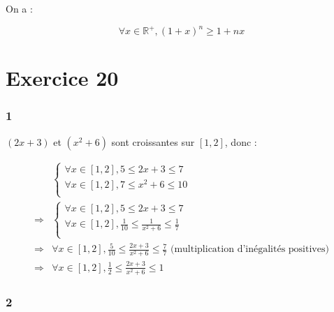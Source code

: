 \documentclass{report}
\begin{document}
On a :

\begin{displaymath}
	\forall x \in \mathbb{R}^{+}, (1+x)^n  \geq 1 + nx
\end{displaymath}

\section*{Exercice 20}

\subsubsection*{1}

$(2x+3)$ et $(x^2+6)$ sont croissantes sur $[1, 2]$, donc :

\begin{equation*}
	\begin{split}
	&\begin{cases}
		\forall x \in [1, 2], 5 \le 2x+3 \le 7 \\
		\forall x \in [1, 2], 7 \le x^2+6 \le 10 \\
	\end{cases} \\
	\Rightarrow
	&\begin{cases}
		\forall x \in [1, 2], 5 \le 2x+3 \le 7 \\
		\forall x \in [1, 2], \frac{1}{10} \le \frac{1}{x^2+6} \le \frac{1}{7} \\
	\end{cases}\\
	\Rightarrow
	& \forall x \in [1, 2], \frac{5}{10} \le \frac{2x+3}{x^2+6} \le \frac{7}{7}  \text{ (multiplication d'inégalités positives)}\\
	\Rightarrow
	&\forall x \in [1, 2], \frac{1}{2} \le \frac{2x+3}{x^2+6} \le 1
	\end{split}
\end{equation*}

\subsubsection*{2}
\end{document}
